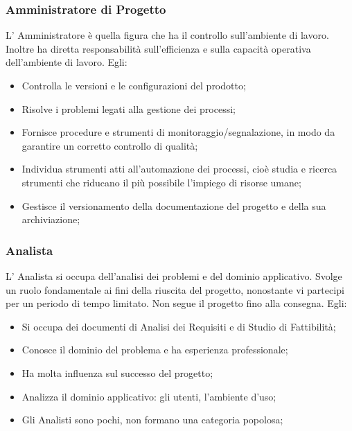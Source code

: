 \subsubsection{Amministratore di Progetto}
L’ Amministratore è quella figura che ha il controllo sull'ambiente di lavoro. Inoltre ha diretta responsabilità sull'efficienza e sulla capacità operativa dell'ambiente di lavoro.
Egli:
\begin{itemize}
\item{Controlla le versioni e le configurazioni del prodotto;}
\item{Risolve i problemi legati alla gestione dei processi;}
\item{Fornisce procedure e strumenti di monitoraggio/segnalazione, in modo da garantire un corretto controllo di qualità;}
\item{Individua strumenti atti all’automazione dei processi, cioè studia e ricerca strumenti che riducano il più possibile l'impiego di risorse umane;}
\item{Gestisce il versionamento della documentazione del progetto e della sua archiviazione;}
\end{itemize}


\subsubsection{Analista}
L’ Analista si occupa dell’analisi dei problemi e del dominio applicativo. Svolge un ruolo fondamentale ai fini della riuscita del progetto, nonostante vi partecipi per un periodo di tempo limitato. Non segue il progetto fino alla consegna.
Egli:
\begin{itemize}
\item{Si occupa dei documenti di Analisi dei Requisiti e di Studio di Fattibilità;}
\item{Conosce il dominio del problema e ha esperienza professionale;}
\item{Ha molta influenza sul successo del progetto;}
\item{Analizza il dominio applicativo:  gli utenti, l’ambiente d’uso;}
\item{Gli Analisti sono pochi, non formano una categoria popolosa;}
\end{itemize}


